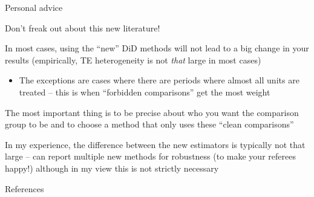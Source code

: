 \documentclass[aspectratio = 169, 13pt]{beamer}
\begin{document}
\begin{frame}{Personal advice}
	\begin{wideitemize}
		\item
		Don't freak out about this new literature!
		
		\pause
		\item
		In most cases, using the ``new'' DiD methods will not lead to a big change in your results (empirically, TE heterogeneity is not \textit{that} large in most cases)
		\begin{itemize}
			\item
			The exceptions are cases where there are periods where almost all units are treated -- this is when ``forbidden comparisons'' get the most weight
		\end{itemize}
		
		\pause
		\item
		The most important thing is to be precise about who you want the comparison group to be and to choose a method that only uses these ``clean comparisons''
		
		\pause
		\item
		In my experience, the difference between the new estimators is typically not that large -- can report multiple new methods for robustness (to make your referees happy!) although in my view this is not strictly necessary
	\end{wideitemize}
\end{frame}


\backupbegin
\begin{frame}{References}
  
\end{frame}
\backupend
\end{document}
